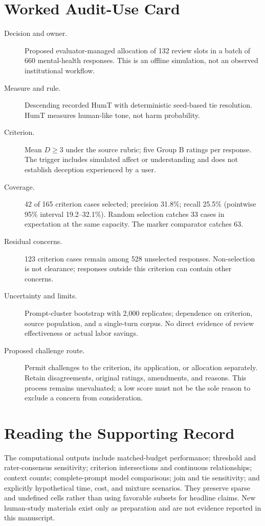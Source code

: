 \documentclass[manuscript,screen,review,anonymous]{acmart}
\begin{document}
\section{Worked Audit-Use Card}\label{app:card}
\begin{description}
\item[Decision and owner.] Proposed evaluator-managed allocation of 132 review slots in a batch of 660 mental-health responses. This is an offline simulation, not an observed institutional workflow.
\item[Measure and rule.] Descending recorded HumT with deterministic seed-based tie resolution. HumT measures human-like tone, not harm probability.
\item[Criterion.] Mean $D\geq3$ under the source rubric; five Group B ratings per response. The trigger includes simulated affect or understanding and does not establish deception experienced by a user.
\item[Coverage.] 42 of 165 criterion cases selected; precision 31.8\%; recall 25.5\% (pointwise 95\% interval 19.2--32.1\%). Random selection catches 33 cases in expectation at the same capacity. The marker comparator catches 63.
\item[Residual concerns.] 123 criterion cases remain among 528 unselected responses. Non-selection is not clearance; responses outside this criterion can contain other concerns.
\item[Uncertainty and limits.] Prompt-cluster bootstrap with 2,000 replicates; dependence on criterion, source population, and a single-turn corpus. No direct evidence of review effectiveness or actual labor savings.
\item[Proposed challenge route.] Permit challenges to the criterion, its application, or allocation separately. Retain disagreements, original ratings, amendments, and reasons. This process remains unevaluated; a low score must not be the sole reason to exclude a concern from consideration.
\end{description}

\section{Reading the Supporting Record}
The computational outputs include matched-budget performance; threshold and rater-consensus sensitivity; criterion intersections and continuous relationships; context counts; complete-prompt model comparisons; join and tie sensitivity; and explicitly hypothetical time, cost, and mixture scenarios. They preserve sparse and undefined cells rather than using favorable subsets for headline claims. New human-study materials exist only as preparation and are not evidence reported in this manuscript.
\end{document}
